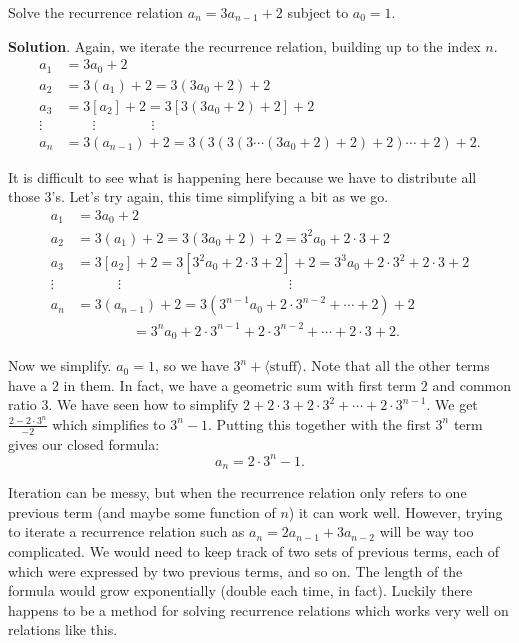 \documentclass[11pt,]{book}
\theoremstyle{ptxplainnotitle}
\theoremstyle{ptxplaintitle}
\theoremstyle{ptxdefinitionnotitle}
\theoremstyle{ptxdefinitiontitle}
\theoremstyle{ptxdefinitionnotitle}
\theoremstyle{ptxdefinitiontitle}
\theoremstyle{ptxdefinitionnotitle}
\theoremstyle{ptxdefinitiontitle}
\theoremstyle{ptxdefinitiontitlenonumber}
\theoremstyle{ptxdefinitiontitlenonumber}
\numberwithin{equation}{chapter}
\newcommand{\amp}{&}
\begin{document}
\begin{example}\label{example-22}
\hypertarget{p-447}{}%
Solve the recurrence relation \(a_n = 3a_{n-1} + 2\) subject to \(a_0 = 1\).%
\par\smallskip%
\noindent\textbf{Solution}.\hypertarget{solution-61}{}\quad%
\hypertarget{p-448}{}%
Again, we iterate the recurrence relation, building up to the index \(n\).%
\begin{align*}
a_1 \amp = 3a_0 + 2\\
a_2 \amp = 3(a_1) + 2 = 3(3a_0 + 2) + 2\\
a_3 \amp = 3[a_2] + 2 = 3[3(3a_0 + 2) + 2] + 2\\
\vdots \amp \qquad \vdots \qquad \qquad \vdots\\
a_n \amp = 3(a_{n-1}) + 2 = 3(3(3(3\cdots(3a_0 + 2) + 2) + 2)\cdots + 2)+ 2.
\end{align*}
%
\par
\hypertarget{p-449}{}%
It is difficult to see what is happening here because we have to distribute all those 3's. Let's try again, this time simplifying a bit as we go.%
\begin{align*}
a_1 \amp = 3a_0 + 2\\
a_2 \amp = 3(a_1) + 2 = 3(3a_0 + 2) + 2 = 3^2a_0 + 2\cdot 3 + 2\\
a_3 \amp = 3[a_2] + 2 = 3[3^2a_0 + 2\cdot 3 + 2] + 2 = 3^3 a_0 + 2 \cdot 3^2 + 2 \cdot 3 + 2\\
\vdots \amp \qquad\quad \vdots \hspace{2in} \vdots\\
a_n \amp = 3(a_{n-1}) + 2 = 3(3^{n-1}a_0 + 2 \cdot 3^{n-2} + \cdots +2)+ 2\\
\amp \qquad \qquad = 3^n a_0 + 2\cdot 3^{n-1} + 2 \cdot 3^{n-2} + \cdots + 2\cdot 3 + 2.
\end{align*}
%
\par
\hypertarget{p-450}{}%
Now we simplify. \(a_0 = 1\), so we have \(3^n + \langle\text{stuff}\rangle\). Note that all the other terms have a 2 in them. In fact, we have a geometric sum with first term \(2\) and common ratio \(3\). We have seen how to simplify \(2 + 2\cdot 3 + 2 \cdot 3^2 + \cdots + 2\cdot 3^{n-1}\). We get \(\frac{2-2\cdot 3^n}{-2}\) which simplifies to \(3^n - 1\). Putting this together with the first \(3^n\) term gives our closed formula:%
\begin{equation*}
a_n = 2\cdot 3^n - 1.
\end{equation*}
%
\end{example}
\hypertarget{p-451}{}%
Iteration can be messy, but when the recurrence relation only refers to one previous term (and maybe some function of \(n\)) it can work well. However, trying to iterate a recurrence relation such as \(a_n = 2 a_{n-1} + 3 a_{n-2}\) will be way too complicated. We would need to keep track of two sets of previous terms, each of which were expressed by two previous terms, and so on. The length of the formula would grow exponentially (double each time, in fact). Luckily there happens to be a method for solving recurrence relations which works very well on relations like this.%
\typeout{************************************************}
\typeout{************************************************}
\end{document}
